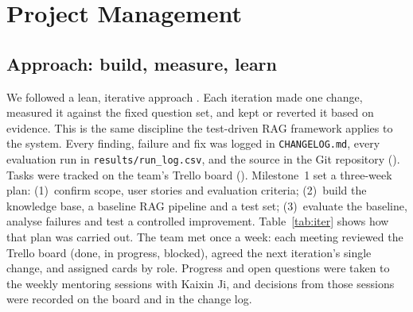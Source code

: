 \section{Project Management}\label{sec:pm}

\subsection{Approach: build, measure, learn}

We followed a lean, iterative approach \citep{ries2011lean}. Each iteration made one change, measured it against the fixed question set, and kept or reverted it based on evidence. This is the same discipline the test-driven RAG framework applies to the system. Every finding, failure and fix was logged in \texttt{CHANGELOG.md}, every evaluation run in \texttt{results/run\_log.csv}, and the source in the Git repository (\githuburl). Tasks were tracked on the team's Trello board (\boardurl). Milestone~1 set a three-week plan: (1)~confirm scope, user stories and evaluation criteria; (2)~build the knowledge base, a baseline RAG pipeline and a test set; (3)~evaluate the baseline, analyse failures and test a controlled improvement. Table~\ref{tab:iter} shows how that plan was carried out. The team met once a week: each meeting reviewed the Trello board (done, in progress, blocked), agreed the next iteration's single change, and assigned cards by role. Progress and open questions were taken to the weekly mentoring sessions with Kaixin Ji, and decisions from those sessions were recorded on the board and in the change log.

